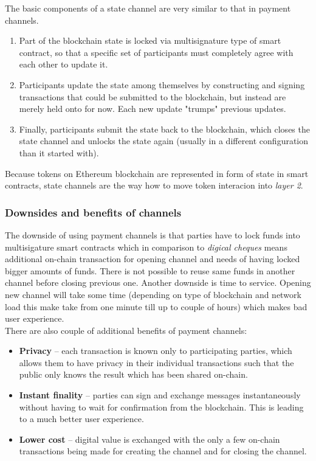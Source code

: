 \documentclass[a4paper,12pt]{article}
\begin{document}
The basic components of a state channel are very similar to that in payment 
channels.

\begin{enumerate}
    \item Part of the blockchain state is locked via multisignature type of smart 
    contract, so that a specific set of participants must completely agree with 
    each other to update it.
    \item Participants update the state among themselves by constructing and 
    signing transactions that could be submitted to the blockchain, but instead 
    are merely held onto for now. Each new update "trumps" previous updates.
    \item Finally, participants submit the state back to the blockchain, which 
    closes the state channel and unlocks the state again (usually in a different 
    configuration than it started with).
\end{enumerate}

Because tokens on Ethereum blockchain are represented in form of state in smart 
contracts, state channels are the way how to move token interacion into 
\textit{layer 2}.\\

\subsubsection{Downsides and benefits of channels}

The downside of using payment channels is that parties have to lock funds into 
multisigature smart contracts which in comparison to \textit{digical cheques} 
means additional on-chain transaction for opening channel and needs of having 
locked bigger amounts of funds. There is not possible to reuse same funds in 
another channel before closing previous one. Another downside is time to 
service. Opening new channel will take some time (depending on type of 
blockchain and network load this make take from one minute till up to couple 
of hours) which makes bad user experience.\\

There are also couple of additional benefits of payment channels:

\begin{itemize}
    \item \textbf{Privacy} -- each transaction is known only to participating 
    parties, which allows them to have privacy in their individual transactions 
    such that the public only knows the result which has been shared on-chain.
    \item \textbf{Instant finality} -- parties can sign and exchange messages
    instantaneously without having to wait for confirmation from the blockchain.
    This is leading to a much better user experience.
    \item \textbf{Lower cost} -- digital value is exchanged with the only a few
    on-chain transactions being made for creating the channel and for closing
    the channel.
\end{itemize}
\end{document}
